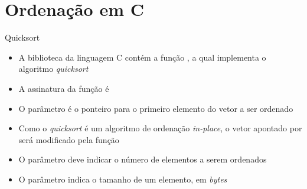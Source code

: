 \section{Ordenação em C}

\begin{frame}[fragile]{Quicksort}

    \begin{itemize}
        \item A biblioteca  da linguagem C contém a função 
            , a qual implementa o algoritmo \textit{quicksort}

        \item A assinatura da função  é

        \item O parâmetro  é o ponteiro para o primeiro elemento do vetor a 
            ser ordenado

        \item Como o \textit{quicksort} é um algoritmo de ordenação \textit{in-place}, o vetor
            apontado por  será modificado pela função 

        \item O parâmetro  deve indicar o número de elementos a serem ordenados

        \item O parâmetro  indica o tamanho de um elemento, em \textit{bytes}
    \end{itemize}

\end{frame}

